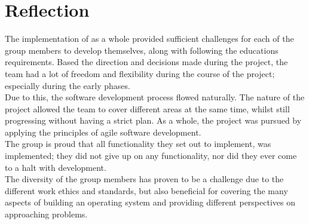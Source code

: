 \section{Reflection}
The implementation of \OSname{} as a whole provided sufficient challenges
for each of the group members to develop themselves, along with following
the education\textquotesingle s requirements.
Based the direction and decisions made during the project,
the team had a lot of freedom and flexibility during the
course of the project; especially during the early phases.
\\
Due to this, the software development process flowed naturally.
The nature of the project allowed the team to cover different
areas at the same time, whilst still progressing without
having a strict plan.
As a whole, the project was pursued by applying the principles
of agile software development.
\\
The group is proud that all functionality they set out to
implement, was implemented; they did not give up on any
functionality, nor did they ever come to a halt with development.
\\
The diversity of the group members has proven to be a challenge
due to the different work ethics and standards,
but also beneficial for covering the many aspects of building
an operating system and providing different perspectives on
approaching problems.

